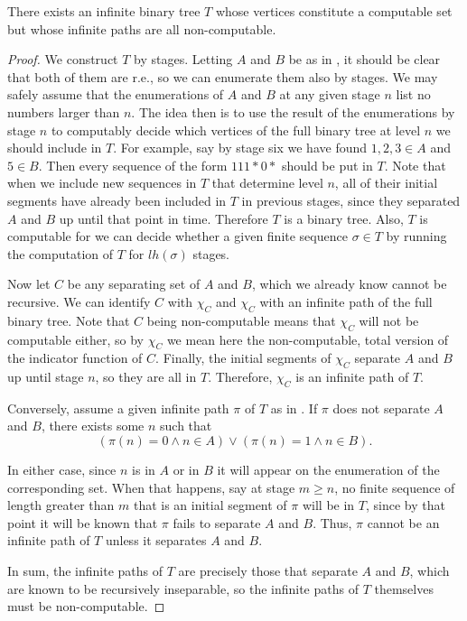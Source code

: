 \documentclass[../main.tex]{memoir}
\begin{document}
\begin{theorem}
  \label{thm:wkl-counterexample}
  There exists an infinite binary tree $T$ whose vertices constitute a computable set but whose infinite paths are all non-computable.
\end{theorem}
\begin{proof}
  We construct $T$ by stages. Letting $A$ and $B$ be as in , it should be clear that both of them are r.e., so we can enumerate them also by stages. We may safely assume that the enumerations of $A$ and $B$ at any given stage $n$ list no numbers larger than $n$. The idea then is to use the result of the enumerations by stage $n$ to computably decide which vertices of the full binary tree at level $n$ we should include in $T$. For example, say by stage six we have found $1, 2, 3 \in A$ and $5 \in B$. Then every sequence of the form $111*0*$ should be put in $T$. Note that when we include new sequences in $T$ that determine level $n$, all of their initial segments have already been included in $T$ in previous stages, since they separated $A$ and $B$ up until that point in time. Therefore $T$ is a binary tree. Also, $T$ is computable for we can decide whether a given finite sequence $\sigma \in T$ by running the computation of $T$ for $lh(\sigma)$ stages.

  Now let $C$ be any separating set of $A$ and $B$, which we already know cannot be recursive. We can identify $C$ with $\chi_C$ and $\chi_C$ with an infinite path of the full binary tree. Note that $C$ being non-computable means that $\chi_C$ will not be computable either, so by $\chi_C$ we mean here the non-computable, total version of the indicator function of $C$. Finally, the initial segments of $\chi_C$ separate $A$ and $B$ up until stage $n$, so they are all in $T$. Therefore, $\chi_C$ is an infinite path of $T$.

  Conversely, assume a given infinite path $\pi$ of $T$ as in . If $\pi$ does not separate $A$ and $B$, there exists some $n$ such that
  \[ (\pi(n) = 0 \land n \in A) \lor (\pi(n) = 1 \land n \in B). \]

  In either case, since $n$ is in $A$ or in $B$ it will appear on the enumeration of the corresponding set. When that happens, say at stage $m \ge n$, no finite sequence of length greater than $m$ that is an initial segment of $\pi$ will be in $T$, since by that point it will be known that $\pi$ fails to separate $A$ and $B$. Thus, $\pi$ cannot be an infinite path of $T$ unless it separates $A$ and $B$.

  In sum, the infinite paths of $T$ are precisely those that separate $A$ and $B$, which are known to be recursively inseparable, so the infinite paths of $T$ themselves must be non-computable.
\end{proof}
\end{document}
